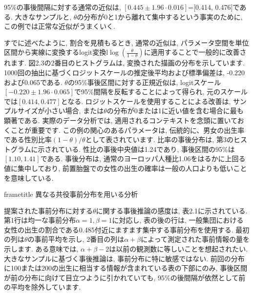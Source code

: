 \documentclass[10pt,dvipdfmx,a4]{beamer}
\newcommand{\dbox}[1]{\begin{beamercolorbox}[wd=122mm, sep=0pt, shadow=false, rounded=false]{frametitle} { #1}\end{beamercolorbox}}
\begin{document}

\begin{frame}
95\%の事後間隔に対する通常の近似は, $[0.445\pm 1.96\cdot 0.016]$=[0.414, 0.476]である.
大きなサンプルと, $\theta$の分布が0と1から離れて集中するという事実のために, この例では正常な近似がうまくいく.

すでに述べたように, 割合を見積もるとき, 通常の近似は, パラメータ空間を単位区間から実線に変換するlogit変換l$\log(\tfrac{\theta}{1-\theta})$に適用することで一般的に改善されます.
図2.3の2番目のヒストグラムは, 変換された描画の分布を示しています.
1000回の抽出に基づくロジットスケールの推定後平均および標準偏差は, -0.220および0.065である.
$\theta$の95\%事後区間に対する正規近似は, logitスケール$[-0.220\pm 1.96\cdot0.065]$で95\%間隔を反転することによって得られ, 元のスケールでは$[0.414,0.477]$となる.
ロジットスケールを使用することによる改善は, サンプルサイズが小さい場合, または$\theta$の分布が0または1に近い値を含む場合に最も顕著である.
実際のデータ分析では, 適用されるコンテキストを念頭に置いておくことが重要です.
この例の関心のあるパラメータは, 伝統的に、男女の出生率である性別比率$(1-\theta)/\theta$として表されています.
比率の事後分布は, 第3のヒストグラムに示されている.
性比の事後中央値は1.24であり, 事後区間の95\%は$[1.10,1.41]$である.
事後分布は, 通常のヨーロッパ人種比1.06をはるかに上回る値に集中しており, 前置胎盤での女性の出生の確率は一般の人口よりも低いことを意味している.
\end{frame}


\begin{frame}
\dbox{異なる共役事前分布を用いる分析}
提案された事前分布に対する$\theta$に関する事後推論の感度は, 表2.1に示されている.
第1行は均一な事前分布$\alpha= 1, \beta= 1$に対応し, 表の後の行は, 一般集団における女性の出生の割合である0.485付近にますます集中する事前分布を使用する.
最初の列は$\theta$の事前平均を示し, 2番目の列は$\alpha+\beta$によって測定された事前情報の量を示します.
ある意味では, $\alpha+\beta-2$は以前の観測数に等しいことを想起されたい.
大きなサンプルに基づく事後推論は, 事前分布に特に敏感ではない.
前回の分布に100または200の出生に相当する情報が含まれている表の下部にのみ, 事後区間が前の分布に向けて目立つように引かれていても, 95\%の後間隔が依然として前の平均を除外しています.
\end{frame}

\end{document}
